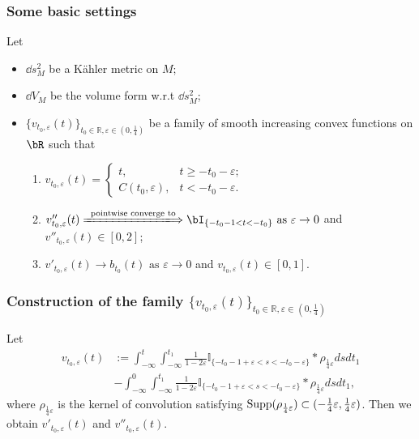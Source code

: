 \subsubsection{Some basic settings}
Let 
\begin{itemize}
  \item $\dd s_M^2$ be a K\"ahler metric on $M$;
  \item $\dd V_M$ be the volume form w.r.t $\dd s_M^2$;
  \item $\{v_{t_0,\varepsilon}(t)\}_{t_0\in\mathbb{R},\varepsilon\in (0,\frac 14)}$ be a family of smooth increasing convex functions on $\bR$ such that 
  \begin{enumerate}[label=(\arabic*)]
    \item $v_{t_0,\varepsilon}(t)=\begin{cases}
      t, & t\geqslant -t_0-\varepsilon;\\ 
      C(t_0,\varepsilon), & t<-t_0-\varepsilon.
    \end{cases}$
    \item $v''_{t_0,\varepsilon}(t)\xLongrightarrow{\text{ pointwise converge to }} \bI_{\{-t_0-1<t<-t_0\}} \text{ as } \varepsilon\to 0$ and $v''_{t_0,\varepsilon}(t)\in [0,2]$;
    \item $v'_{t_0,\varepsilon}(t)\to b_{t_0}(t) \text{ as } \varepsilon\to 0$ and $v_{t_0,\varepsilon}(t)\in [0,1]$.
  \end{enumerate}
\end{itemize}
\subsubsection{Construction of the family \texorpdfstring{$\{v_{t_0,\varepsilon}(t)\}_{t_0\in\mathbb{R},\varepsilon\in (0,\frac 14)}$ }{}}
Let 
\begin{equation}
  \label{}
  \begin{split}
  v_{t_0,\varepsilon}(t)&:=\int_{-\infty}^{t}\int_{-\infty}^{t_{1}}\frac{1}
  {1-2\varepsilon}\mathbb{I}_{\{-t_{0}-1+\varepsilon< s<-t_{0}-\varepsilon\}}
  *\rho_{\frac{1}{4}\varepsilon}dsdt_{1}
  \\&-\int_{-\infty}^{0}\int_{-\infty}^{t_{1}}\frac{1}{1-2\varepsilon}
  \mathbb{I}_{\{-t_{0}-1+\varepsilon< s<-t_{0}-\varepsilon\}}*\rho_{\frac{1}{4}\varepsilon}dsdt_{1},
  \end{split}
  \end{equation}
  where $\rho_{\frac{1}{4}\varepsilon}$ is the kernel of convolution satisfying $\operatorname{Supp}(\rho_{\frac{1}{4}\varepsilon})
  \subset (-\frac{1}{4}\varepsilon,\frac{1}{4}\varepsilon)$.
Then we obtain $v'_{t_0,\varepsilon}(t)$ and $v''_{t_0,\varepsilon}(t)$.
